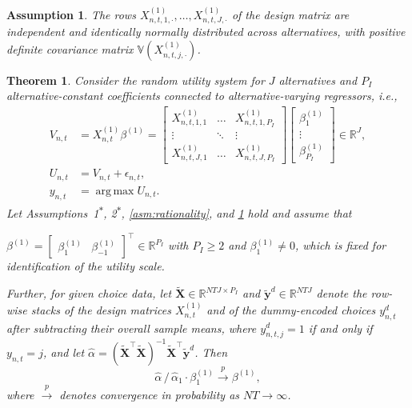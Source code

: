\documentclass[preprint,12pt,authoryear]{elsarticle}
\newtheorem{theorem}{Theorem}
\newtheorem{assumption}{Assumption}
\DeclareRobustCommand{\asmstar}[1]{#1\textsuperscript{$\ast$}}
\newcommand{\asmitem}{\refstepcounter{assumption}\item[Assumption~\theassumption]}
\newcommand{\pto}{\xrightarrow{p}}
\newcommand{\R}{\mathbb{R}}
\newcommand{\Var}{\mathbb{V}}
\DeclareMathOperator*{\argmax}{arg\,max}
\begin{document}
\begin{assumption}\label{asm:type1reg} The rows $X^{(1)}_{n,t,1,\cdot}, \dots, X^{(1)}_{n,t,J,\cdot}$ of the design matrix are independent and identically normally distributed across alternatives, with positive definite covariance matrix $\Var(X^{(1)}_{n,t,j,\cdot})$.
\end{assumption}


\begin{theorem} \label{thm:type1}
Consider the random utility system for $J$ alternatives and $P_I$ alternative-constant coefficients connected to alternative-varying regressors, i.e.,
%
\begin{align*}
    V_{n,t} &= X^{(1)}_{n,t} \beta^{(1)} = \begin{bmatrix} X^{(1)}_{n,t,1,1} & \dots & X^{(1)}_{n,t,1,P_I} \\ \vdots & \ddots & \vdots \\ X^{(1)}_{n,t,J,1} & \dots & X^{(1)}_{n,t,J,P_I} \end{bmatrix} \begin{bmatrix} \beta_1^{(1)} \\ \vdots \\ \beta_{P_I}^{(1)} \end{bmatrix} \in \R^J, \\
    U_{n,t} &= V_{n,t} + \epsilon_{n,t}, \\
    y_{n,t} &= \argmax U_{n,t}.
\end{align*}
%
Let Assumptions~\asmstar{1}, \asmstar{2}, \ref{asm:rationality}, and
\ref{asm:type1reg} hold and assume that
%
\begin{description}
    \asmitem\label{asm:type1coef} $\beta^{(1)} = \begin{bmatrix} \beta^{(1)}_1 & \beta^{(1)}_{-1} \end{bmatrix}^\top \in \R^{P_I}$ with $P_I \geq 2$ and $\beta^{(1)}_1 \neq 0$, which is fixed for identification of the utility scale.
\end{description}
%
Further, for given choice data, let $\tilde{\bm{X}} \in \R^{NTJ\times P_I}$ and $\tilde{\bm{y}}^d \in \R^{NTJ}$ denote the row-wise stacks of the design matrices $X^{(1)}_{n,t}$ and of the dummy-encoded choices $y_{n,t}^d$ after subtracting their overall sample means, where $y_{n,t,j}^d = 1$ if and only if $y_{n,t} = j$, and let $\hat{\alpha} = (\tilde{\bm{X}}^\top \tilde{\bm{X}})^{-1} \tilde{\bm{X}}^\top \tilde{\bm{y}}^d$. Then $$\hat{\alpha} \,/\, \hat{\alpha}_1 \cdot \beta^{(1)}_1 \pto \beta^{(1)},$$ where $\pto$ denotes convergence in probability as $NT \to \infty$.
\end{theorem}
\end{document}
